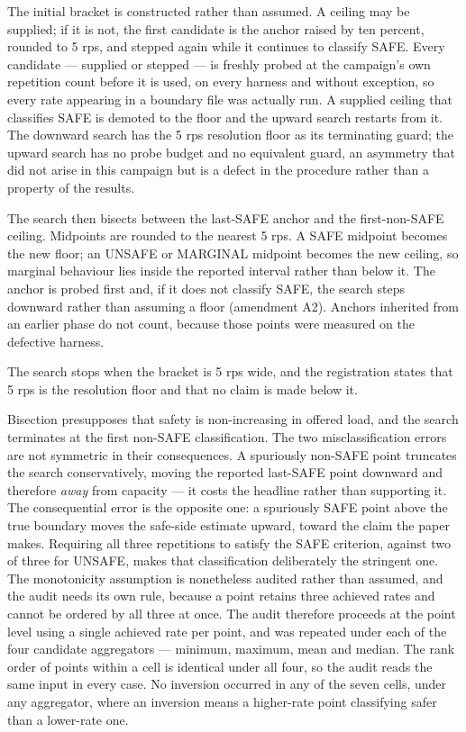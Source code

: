 \documentclass{ieeeaccess}
\begin{document}
The initial bracket is constructed rather than assumed. A ceiling may be supplied; if it is not, the first candidate is the anchor raised by ten percent, rounded to 5 rps, and stepped again while it continues to classify SAFE. Every candidate --- supplied or stepped --- is freshly probed at the campaign's own repetition count before it is used, on every harness and without exception, so every rate appearing in a boundary file was actually run. A supplied ceiling that classifies SAFE is demoted to the floor and the upward search restarts from it. The downward search has the 5 rps resolution floor as its terminating guard; the upward search has no probe budget and no equivalent guard, an asymmetry that did not arise in this campaign but is a defect in the procedure rather than a property of the results.

The search then bisects between the last-SAFE anchor and the first-non-SAFE ceiling. Midpoints are rounded to the nearest 5 rps. A SAFE midpoint becomes the new floor; an UNSAFE or MARGINAL midpoint becomes the new ceiling, so marginal behaviour lies inside the reported interval rather than below it. The anchor is probed first and, if it does not classify SAFE, the search steps downward rather than assuming a floor (amendment A2). Anchors inherited from an earlier phase do not count, because those points were measured on the defective harness.

The search stops when the bracket is 5 rps wide, and the registration states that 5 rps is the resolution floor and that no claim is made below it.

Bisection presupposes that safety is non-increasing in offered load, and the search terminates at the first non-SAFE classification. The two misclassification errors are not symmetric in their consequences. A spuriously non-SAFE point truncates the search conservatively, moving the reported last-SAFE point downward and therefore \textit{away} from capacity --- it costs the headline rather than supporting it. The consequential error is the opposite one: a spuriously SAFE point above the true boundary moves the safe-side estimate upward, toward the claim the paper makes. Requiring all three repetitions to satisfy the SAFE criterion, against two of three for UNSAFE, makes that classification deliberately the stringent one. The monotonicity assumption is nonetheless audited rather than assumed, and the audit needs its own rule, because a point retains three achieved rates and cannot be ordered by all three at once. The audit therefore proceeds at the point level using a single achieved rate per point, and was repeated under each of the four candidate aggregators --- minimum, maximum, mean and median. The rank order of points within a cell is identical under all four, so the audit reads the same input in every case. No inversion occurred in any of the seven cells, under any aggregator, where an inversion means a higher-rate point classifying safer than a lower-rate one.
\end{document}
